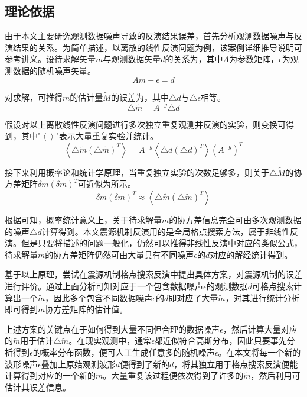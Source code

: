 \subsection{理论依据}
由于本文主要研究观测数据噪声导致的反演结果误差，首先分析观测数据噪声与反演结果的关系。为简单描述，以离散的线性反演问题为例，该案例详细推导说明可参考讲义。设待求解矢量$m$与观测数据矢量$d$的关系为，其中$A$为参数矩阵，$\epsilon$为观测数据的随机噪声矢量。
\begin{equation}
\label{eq2_17}
	Am+\epsilon=d
\end{equation}

对求解，可推得$m$的估计量$\tilde{M}$的误差为，其中${\triangle}d$与${\triangle}\epsilon$相等。
\begin{equation}
\label{eq2_18}
	\triangle{\tilde{m}}=A^{-g}{\triangle}d
\end{equation}

假设对以上离散线性反演问题进行多次独立重复观测并反演的实验，则变换可得到，其中"$\left \langle \right \rangle$"表示大量重复实验并统计。
\begin{equation}
\label{eq2_19}
	\left \langle \triangle{\tilde{m}}(\triangle{\tilde{m}})^T \right \rangle=
	A^{-g}\left \langle {\triangle}d({\triangle}d)^T \right \rangle  (A^{-g})^T
\end{equation}

接下来利用概率论和统计学原理，当重复独立实验的次数足够多，则关于$\triangle{\tilde{M}}$的协方差矩阵${\delta}m({\delta}m)^T$可近似为所示。
\begin{equation}
\label{eq2_20}
	{\delta}m({\delta}m)^T \approx \left \langle \triangle{\tilde{m}}(\triangle{\tilde{m}})^T \right \rangle
\end{equation}

根据可知，概率统计意义上，关于待求解量$m$的协方差信息完全可由多次观测数据的噪声${\triangle}d$计算得到。本文震源机制反演用的是全局格点搜索方法，属于非线性反演。但是只要将描述的问题一般化，仍然可以推得非线性反演中对应的类似公式，待求解量$m$的协方差矩阵仍然可由大量具有不同噪声$\epsilon$的$d$对应的解经统计得到。

基于以上原理，尝试在震源机制格点搜索反演中提出具体方案，对震源机制的误差进行评价。通过上面分析可知对应于一个包含数据噪声$\epsilon$的观测数据$d$可格点搜索计算出一个$\tilde{m}$，因此多个包含不同数据噪声$\epsilon$的$d$即对应了大量$\tilde{m}$，对其进行统计分析即可得到$m$协方差矩阵的估计值。

上述方案的关键点在于如何得到大量不同但合理的数据噪声$\epsilon$，然后计算大量对应的$\tilde{m}$用于估计${\triangle}\tilde{m}$。在现实观测中，通常$\epsilon$都近似符合高斯分布，因此只要事先分析得到$\epsilon$的概率分布函数，便可人工生成任意多的随机噪声$\epsilon$。在本文将每一个新的波形噪声$\epsilon$叠加上原始观测波形$d$便得到了新的$d$，将其独立用于格点搜索反演便能计算得到对应的一个新的$\tilde{m}$。大量重复该过程便依次得到了许多的$\tilde{m}$，然后利用可估计其误差信息。


